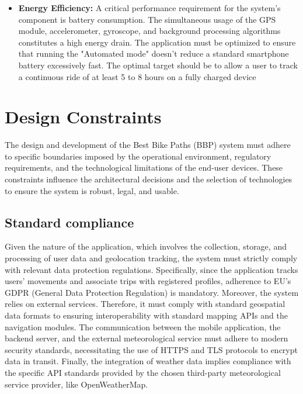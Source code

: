\begin{itemize}
    \item \textbf{Energy Efficiency:} A critical performance requirement for the system's component is battery consumption. The simultaneous usage of the GPS module, accelerometer, gyroscope, and background processing algorithms constitutes a high energy drain. The application must be optimized to ensure that running the "Automated mode" doesn't reduce a standard smartphone battery excessively fast. The optimal target should be to allow a user to track a continuous ride of at least 5 to 8 hours on a fully charged device

\end{itemize}

\newpage
\section{Design Constraints}
The design and development of the Best Bike Paths (BBP) system must adhere to specific boundaries imposed 
by the operational environment, regulatory requirements, and the technological limitations of the end-user devices.
These constraints influence the architectural decisions and the selection of technologies to ensure the system is robust, 
legal, and usable.

\subsection{Standard compliance}
Given the nature of the application, which involves the collection, storage, and processing of user data and geolocation tracking,
the system must strictly comply with relevant data protection regulations. Specifically, since the application tracks users' movements 
and associate trips with registered profiles, adherence to EU's GDPR (General Data Protection Regulation) is mandatory.
Moreover, the system relies on external services. Therefore, it must comply with standard geospatial data formats to ensuring interoperability 
with standard mapping APIs and the navigation modules. The communication between the mobile application, the backend server, and the external 
meteorological service must adhere to modern security standards, necessitating the use of HTTPS and TLS protocols to encrypt data in transit. 
Finally, the integration of weather data implies compliance with the specific API standards provided by the chosen third-party meteorological service provider, like OpenWeatherMap.

